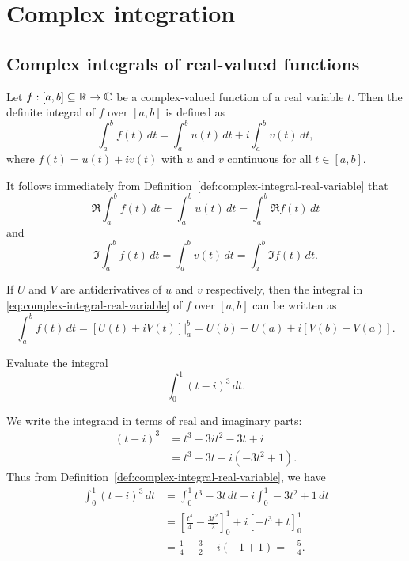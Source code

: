 \chapter{Complex integration}

\section{Complex integrals of real-valued functions}

\begin{definition}
    \label{def:complex-integral-real-variable}
    Let \(f: [a, b] \subseteq \mathbb{R} \to \mathbb{C}\) be a complex-valued function of a real variable \(t\). Then the definite integral of \(f\) over \([a, b]\) is defined as
    \begin{equation}
        \int_a^b f(t) \, dt = \int_a^b u(t) \, dt + i \int_a^b v(t) \, dt,
        \label{eq:complex-integral-real-variable}
    \end{equation}
    where \(f(t) = u(t) + iv(t)\) with \(u\) and \(v\) continuous for all \(t \in [a, b]\).
\end{definition}

It follows immediately from Definition~\ref{def:complex-integral-real-variable} that
\[
    \Re \int_a^b f(t) \, dt = \int_a^b u(t) \, dt = \int_a^b \Re f(t) \, dt
\]
and
\[
    \Im \int_a^b f(t) \, dt = \int_a^b v(t) \, dt = \int_a^b \Im f(t) \, dt.
\]

If \(U\) and \(V\) are antiderivatives of \(u\) and \(v\) respectively, then the integral in \eqref{eq:complex-integral-real-variable} of \(f\) over \([a, b]\) can be written as
\[
    \int_a^b f(t) \, dt = [U(t) + iV(t)]\big|_a^b = U(b) - U(a) + i[V(b) - V(a)].
\]

\begin{example}
    Evaluate the integral
    \[
        \int_0^1 (t-i)^3 \, dt.
    \]
    \begin{solution}
        We write the integrand in terms of real and imaginary parts:
        \begin{align*}
            (t - i)^3 &= t^3 - 3it^2 - 3t + i \\
            &= t^3 - 3t + i(-3t^2 + 1).
        \end{align*}
        Thus from Definition~\ref{def:complex-integral-real-variable}, we have
        \begin{align*}
            \int_0^1 (t - i)^3 \, dt &= \int_0^1 t^3 - 3t \, dt + i \int_0^1 -3t^2 + 1 \, dt \\
            &= \left[ \frac{t^4}{4} - \frac{3t^2}{2} \right]_0^1 + i \left[ -t^3 + t \right]_0^1 \\
            &= \frac{1}{4} - \frac{3}{2} + i(-1 + 1) = -\frac{5}{4}.
        \end{align*}
    \end{solution}
\end{example}


